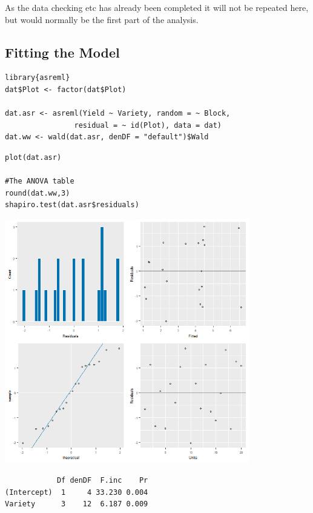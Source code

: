 \documentclass[a4paper, 10pt, fleqn, twosided]{memoir}
\begin{document}
As the data checking etc has already been completed it will not be repeated here, but would normally be the first part
of the analysis.

\subsection{Fitting the Model}

\begin{tcolorbox}[title = Fitting the linear mixed model for a RCBD]
\begin{verbatim}
library{asreml}
dat$Plot <- factor(dat$Plot)

dat.asr <- asreml(Yield ~ Variety, random = ~ Block,
                residual = ~ id(Plot), data = dat)
dat.ww <- wald(dat.asr, denDF = "default")$Wald
\end{verbatim}

\tcblower
\begin{verbatim}
plot(dat.asr)

#The ANOVA table
round(dat.ww,3)
shapiro.test(dat.asr$residuals)
\end{verbatim}
\end{tcolorbox}

\begin{tcolorbox}[title = Example 3 Output]
\includegraphics[width=0.8\textwidth, frame]{Example3LMMResplot.png}
\begin{verbatim}
            Df denDF  F.inc    Pr
(Intercept)  1     4 33.230 0.004
Variety      3    12  6.187 0.009
\end{verbatim}
\end{tcolorbox}
\end{document}
